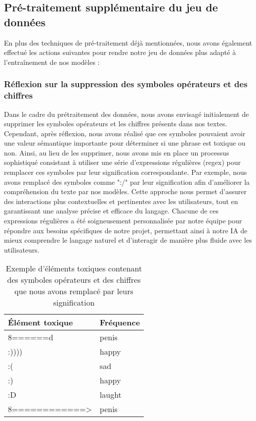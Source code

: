 \subsection{Pré-traitement supplémentaire du jeu de données}

En plus des techniques de pré-traitement déjà mentionnées, nous avons également effectué les actions suivantes pour rendre notre jeu de données plus adapté à l'entraînement de nos modèles :

\subsubsection*{Réflexion sur la suppression des symboles opérateurs et des chiffres}

Dans le cadre du prétraitement des données, nous avons envisagé initialement de supprimer les symboles opérateurs et les chiffres présents dans nos textes. Cependant, après réflexion, nous avons réalisé que ces symboles pouvaient avoir une valeur sémantique importante pour déterminer si une phrase est toxique ou non. Ainsi, au lieu de les supprimer, nous avons mis en place un processus sophistiqué consistant à utiliser une série d'expressions régulières (regex) pour remplacer ces symboles par leur signification correspondante. Par exemple, nous avons remplacé des symboles comme ":/" par leur signification afin d'améliorer la compréhension du texte par nos modèles. Cette approche nous permet d'assurer des interactions plus contextuelles et pertinentes avec les utilisateurs, tout en garantissant une analyse précise et efficace du langage. Chacune de ces expressions régulières a été soigneusement personnalisée par notre équipe pour répondre aux besoins spécifiques de notre projet, permettant ainsi à notre IA de mieux comprendre le langage naturel et d'interagir de manière plus fluide avec les utilisateurs.

\begin{table}[h]
\centering
\begin{tabular}{|l|l|}
\hline
\textbf{Élément toxique} & \textbf{Fréquence} \\ \hline
8======d~~ & penis \\ \hline
:)))) & happy \\ \hline
:( & sad \\ \hline
:) & happy \\ \hline
:D & laught \\ \hline
8============> & penis \\ \hline
\end{tabular}
\caption{Exemple d'éléments toxiques contenant des symboles opérateurs et des chiffres que nous avons remplacé par leurs signification}
\end{table}



